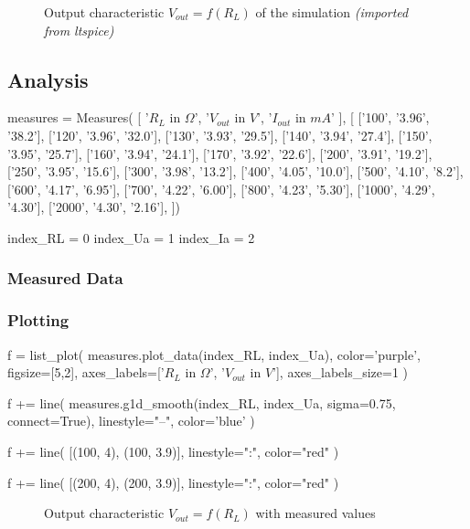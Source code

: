 \begin{figure}[H]
    \centering
    \caption{Output characteristic \textbf{$V_{out} = f(R_L)$} of the simulation \textit{(imported from ltspice)}}
\end{figure}

\subsection{Analysis}

\begin{sagesilent}
    measures = Measures(
        [
            '$R_L$ in $\Omega$',
            '$V_{out}$ in $V$', 
            '$I_{out}$ in $mA$'
        ], [
            ['100', '3.96', '38.2'],
            ['120', '3.96', '32.0'],
            ['130', '3.93', '29.5'],
            ['140', '3.94', '27.4'],
            ['150', '3.95', '25.7'],
            ['160', '3.94', '24.1'],
            ['170', '3.92', '22.6'],
            ['200', '3.91', '19.2'],
            ['250', '3.95', '15.6'],
            ['300', '3.98', '13.2'],
            ['400', '4.05', '10.0'],
            ['500', '4.10', '8.2'],
            ['600', '4.17', '6.95'],
            ['700', '4.22', '6.00'],
            ['800', '4.23', '5.30'],
            ['1000', '4.29', '4.30'],
            ['2000', '4.30', '2.16'],
    ])

    index_RL = 0
    index_Ua = 1
    index_Ia = 2
\end{sagesilent}

\subsubsection{Measured Data}

\begin{center}
    \renewcommand{\arraystretch}{1.2}
\end{center}

\subsubsection{Plotting}

\begin{sagesilent}
    f = list_plot(
        measures.plot_data(index_RL, index_Ua),
        color='purple',
        figsize=[5,2],
        axes_labels=['$R_L$ in $\Omega$', '$V_{out}$ in $V$'],
        axes_labels_size=1
    )

    f += line(
        measures.g1d_smooth(index_RL, index_Ua, sigma=0.75, connect=True),
        linestyle="--",
        color='blue'
    )

    f += line(
        [(100, 4), (100, 3.9)],
        linestyle=":",
        color="red"
    )

    f += line(
        [(200, 4), (200, 3.9)],
        linestyle=":",
        color="red"
    )
\end{sagesilent}

\begin{figure}[H]
    \centering
    \caption{Output characteristic \textbf{$V_{out} = f(R_L)$} with measured values}
\end{figure}